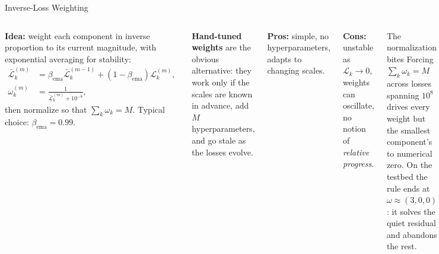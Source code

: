 \documentclass[aspectratio=169,11pt]{beamer}
\newcommand{\emphc}[1]{\textcolor{harvardcrimson}{#1}}
\begin{document}
\begin{frame}{Inverse-Loss Weighting}
\begin{columns}[T]
\textbf{Idea:} weight each component in inverse proportion to its current magnitude, with exponential averaging for stability:
\begin{align*}
    \bar{\mathcal{L}}_k^{(m)} &= \beta_{\mathrm{ema}} \bar{\mathcal{L}}_k^{(m-1)} + (1 - \beta_{\mathrm{ema}}) \mathcal{L}_k^{(m)},\\
    \omega_k^{(m)} &= \frac{1}{\bar{\mathcal{L}}_k^{(m)} + 10^{-8}},
\end{align*}
then normalize so that $\sum_k \omega_k = M$. Typical choice: $\beta_{\mathrm{ema}} = 0.99$.

\vspace{0.2cm}
{\footnotesize \textbf{Hand-tuned weights} are the obvious alternative: they work only if the scales are known in advance, add $M$ hyperparameters, and go stale as the losses evolve.}

\textbf{Pros:} simple, no hyperparameters, adapts to changing scales.

\vspace{0.2cm}
\textbf{Cons:} unstable as $\mathcal{L}_k \to 0$, weights can oscillate, no notion of \emph{relative progress}.

\vspace{0.25cm}
\begin{alertblock}{The normalization bites}
\footnotesize
Forcing $\sum_k \omega_k = M$ across losses spanning $10^8$ drives every weight but the smallest component's to \emphc{numerical zero}. On the testbed the rule ends at $\omega \approx (3, 0, 0)$: it solves the quiet residual and abandons the rest.
\end{alertblock}
\end{columns}
\end{frame}
\end{document}
